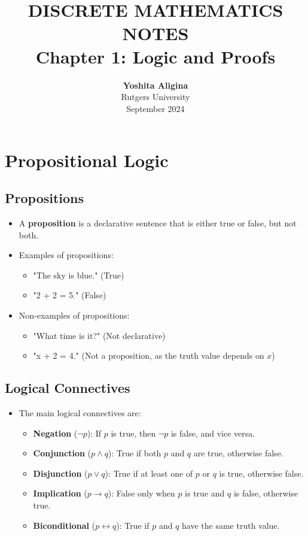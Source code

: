\documentclass{article}
\title{ \normalsize \textsc{}
		\\ [2.0cm]
		\HRule{1.5pt} \\
		\LARGE \textbf{\uppercase{Discrete Mathematics Notes}
		\HRule{2.0pt} \\ [0.6cm] \LARGE{Chapter 1: Logic and Proofs} \vspace*{10\baselineskip}}
		}
\date{}
\author{\textbf{Yoshita Aligina} \\ 
		Rutgers University \\ 
		September 2024}
\begin{document}
\maketitle
\newpage

\tableofcontents
\newpage


\section{Propositional Logic}

\subsection{Propositions}
\begin{itemize}
    \item A \textbf{proposition} is a declarative sentence that is either true or false, but not both.
    \item Examples of propositions:
    \begin{itemize}
        \item "The sky is blue." (True)
        \item "2 + 2 = 5." (False)
    \end{itemize}
    \item Non-examples of propositions:
    \begin{itemize}
        \item "What time is it?" (Not declarative)
        \item "x + 2 = 4." (Not a proposition, as the truth value depends on $x$)
    \end{itemize}
\end{itemize}

\subsection{Logical Connectives}
\begin{itemize}
    \item The main logical connectives are:
    \begin{itemize}
        \item \textbf{Negation} ($\neg p$): If $p$ is true, then $\neg p$ is false, and vice versa.
        \item \textbf{Conjunction} ($p \land q$): True if both $p$ and $q$ are true, otherwise false.
        \item \textbf{Disjunction} ($p \lor q$): True if at least one of $p$ or $q$ is true, otherwise false.
        \item \textbf{Implication} ($p \to q$): False only when $p$ is true and $q$ is false, otherwise true.
        \item \textbf{Biconditional} ($p \leftrightarrow q$): True if $p$ and $q$ have the same truth value.
    \end{itemize}
\end{itemize}
\end{document}
